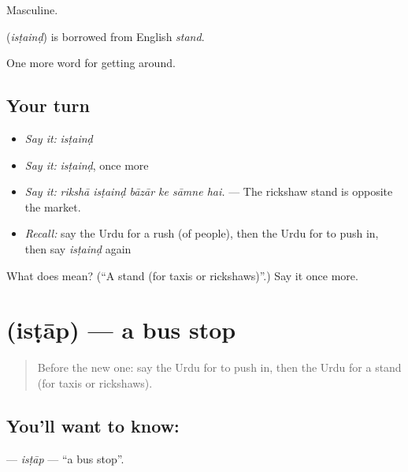 Masculine.

\begin{cousinweb}
\textbf{} (\emph{isṭainḍ}) is borrowed from English \emph{stand}.
\end{cousinweb}

\begin{grammarlens}[title={What you've built}]
One more word for getting around.
\end{grammarlens}

\subsection*{Your turn}
\begin{itemize}
\raggedright
  \item \emph{Say it:} \emph{isṭainḍ}
  \item \emph{Say it:} \emph{isṭainḍ}, once more
  \item \emph{Say it:} \emph{rikshā isṭainḍ bāzār ke sāmne hai.} — The rickshaw stand is opposite the market.
  \item \emph{Recall:} say the Urdu for a rush (of people), then the Urdu for to push in, then say \emph{isṭainḍ} again
\end{itemize}

\begin{tcolorbox}[breakable,colback=teal!4,colframe=teal!35!black,title={Before you move on}]
What does  mean? (\textquotedblleft{}A stand (for taxis or rickshaws)\textquotedblright{}.) Say it once more.
\end{tcolorbox}
\section[\texorpdfstring{\ur{اسٹاپ} (isṭāp)}{اسٹاپ (isṭāp)}]{ (isṭāp) — a bus stop}

\label{lesson:UR-C392-istap}



\begin{quote}
Before the new one: say the Urdu for to push in, then the Urdu for a stand (for taxis or rickshaws).
\end{quote}

\subsection*{You'll want to know: }
\textbf{} — \emph{isṭāp} — \textquotedblleft{}a bus stop\textquotedblright{}.

